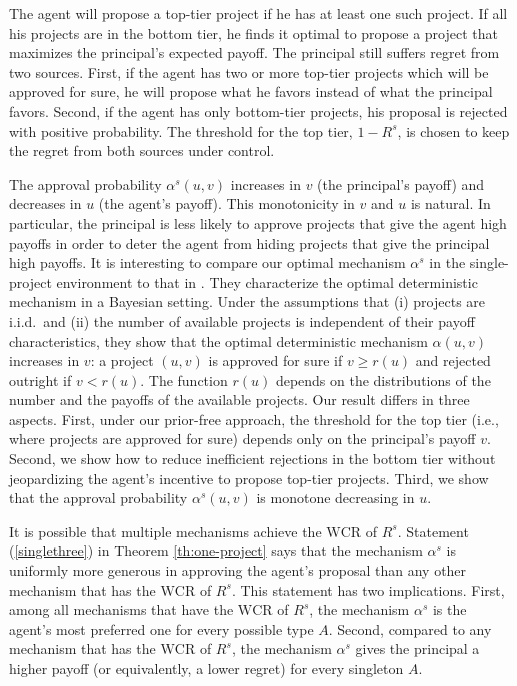 \documentclass[12pt,english]{article}
\theoremstyle{remark}
\theoremstyle{plain}
\theoremstyle{definition}
\newcommand{\wcr}{\mathrm{WCR}}
\begin{document}
The agent will propose a top-tier project if he has at least one such project. If all his projects are in the bottom tier, he finds it optimal to propose a project that maximizes the principal's expected payoff. The principal still suffers regret from two sources. First, if the agent has two or more top-tier projects which will be approved for sure, he will propose what he favors instead of what the principal favors. Second, if the agent has only bottom-tier projects, his proposal is rejected with positive probability. The threshold for the top tier, $1-R^s$, is chosen to keep the regret from both sources under control. 

The approval probability $\alpha^s(u,v)$ increases in $v$ (the principal's payoff) and decreases in $u$ (the agent's payoff). This monotonicity in $v$ and $u$ is natural. In particular, the principal is less likely to approve projects that give the agent high payoffs in order to deter the agent from hiding projects that give the principal high payoffs. It is interesting to compare our optimal mechanism $\alpha^s$ in the single-project environment to that in \cite{ArmstrongVickers2010}. They characterize the optimal deterministic mechanism in a Bayesian setting. Under the assumptions that (i) projects are i.i.d.\ and (ii) the number of available projects is independent of their payoff characteristics, they show that the optimal deterministic mechanism $\alpha(u,v)$ increases in $v$: a project $(u,v)$ is approved for sure if $v \geqslant r (u)$ and rejected outright if $v < r (u)$. The function $r(u)$ depends on the distributions of the number and the payoffs of the available projects. Our result differs in three aspects. First, under our prior-free approach, the threshold for the top tier (i.e., where projects are approved for sure) depends only on the principal's payoff $v$. Second, we show how to reduce inefficient rejections in the bottom tier without jeopardizing the agent's incentive to propose top-tier projects. Third, we show that the approval probability $\alpha^s(u,v)$ is monotone decreasing in $u$. 



It is possible that multiple mechanisms achieve the $\wcr$ of $R^s$. Statement (\ref{singlethree}) in Theorem \ref{th:one-project} says that the mechanism $\alpha^s$ is uniformly more generous in approving the agent's proposal than any other mechanism that has the $\wcr$ of $R^s$. This statement has two implications. First, among all mechanisms that have the $\wcr$ of $R^s$, the mechanism $\alpha^s$ is the agent's most preferred one for every possible type $A$. Second, compared to any mechanism that has the $\wcr$ of $R^s$, the mechanism $\alpha^s$ gives the principal a higher payoff (or equivalently, a lower regret) for every singleton $A$. %
\end{document}
